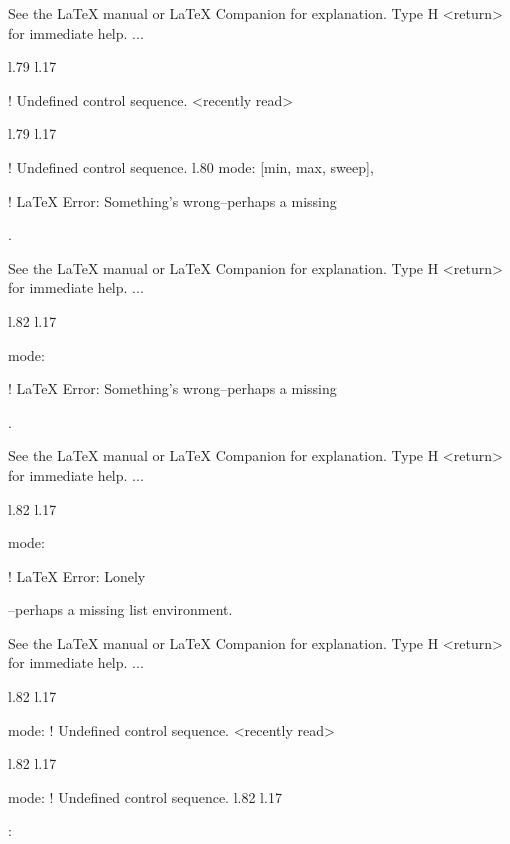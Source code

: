 {{{{{See the LaTeX manual or LaTeX Companion for explanation.
Type  H <return>  for immediate help.
 ...                                              
                                                  
l.79 l.17     \item \xmlNode
                            
! Undefined control sequence.
<recently read> \xmlNode 
                         
l.79 l.17     \item \xmlNode
                            
! Undefined control sequence.
l.80                        {mode}: \xmlDesc
                                            {[min, max, sweep]},

! LaTeX Error: Something's wrong--perhaps a missing \item.

See the LaTeX manual or LaTeX Companion for explanation.
Type  H <return>  for immediate help.
 ...                                              
                                                  
l.82 l.17     \item \xmlNode
                            {mode}: \xmlDesc

! LaTeX Error: Something's wrong--perhaps a missing \item.

See the LaTeX manual or LaTeX Companion for explanation.
Type  H <return>  for immediate help.
 ...                                              
                                                  
l.82 l.17     \item \xmlNode
                            {mode}: \xmlDesc

! LaTeX Error: Lonely \item--perhaps a missing list environment.

See the LaTeX manual or LaTeX Companion for explanation.
Type  H <return>  for immediate help.
 ...                                              
                                                  
l.82 l.17     \item \xmlNode
                            {mode}: \xmlDesc
! Undefined control sequence.
<recently read> \xmlNode 
                         
l.82 l.17     \item \xmlNode
                            {mode}: \xmlDesc
! Undefined control sequence.
l.82 l.17     \item {}: \xmlDesc
                                            
}}}}}
